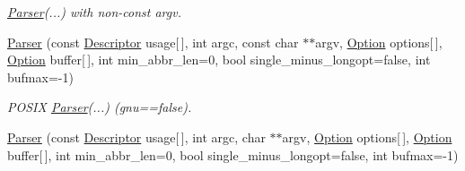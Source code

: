 \begin{DoxyCompactItemize}
\begin{DoxyCompactList}\small\item\em \hyperlink{classxmem_1_1config_1_1third__party_1_1_parser}{Parser}(...) with non-\/const argv. \end{DoxyCompactList}\item 
\hypertarget{classxmem_1_1config_1_1third__party_1_1_parser_a3d0990e00bad445fb5753ace6283d497}{}\hyperlink{classxmem_1_1config_1_1third__party_1_1_parser_a3d0990e00bad445fb5753ace6283d497}{Parser} (const \hyperlink{structxmem_1_1config_1_1third__party_1_1_descriptor}{Descriptor} usage\mbox{[}$\,$\mbox{]}, int argc, const char $\ast$$\ast$argv, \hyperlink{classxmem_1_1config_1_1third__party_1_1_option}{Option} options\mbox{[}$\,$\mbox{]}, \hyperlink{classxmem_1_1config_1_1third__party_1_1_option}{Option} buffer\mbox{[}$\,$\mbox{]}, int min\+\_\+abbr\+\_\+len=0, bool single\+\_\+minus\+\_\+longopt=false, int bufmax=-\/1)\label{classxmem_1_1config_1_1third__party_1_1_parser_a3d0990e00bad445fb5753ace6283d497}

\begin{DoxyCompactList}\small\item\em P\+O\+S\+I\+X \hyperlink{classxmem_1_1config_1_1third__party_1_1_parser}{Parser}(...) (gnu==false). \end{DoxyCompactList}\item 
\hypertarget{classxmem_1_1config_1_1third__party_1_1_parser_ad3d40c69fbb64462daf43b84334cb28b}{}\hyperlink{classxmem_1_1config_1_1third__party_1_1_parser_ad3d40c69fbb64462daf43b84334cb28b}{Parser} (const \hyperlink{structxmem_1_1config_1_1third__party_1_1_descriptor}{Descriptor} usage\mbox{[}$\,$\mbox{]}, int argc, char $\ast$$\ast$argv, \hyperlink{classxmem_1_1config_1_1third__party_1_1_option}{Option} options\mbox{[}$\,$\mbox{]}, \hyperlink{classxmem_1_1config_1_1third__party_1_1_option}{Option} buffer\mbox{[}$\,$\mbox{]}, int min\+\_\+abbr\+\_\+len=0, bool single\+\_\+minus\+\_\+longopt=false, int bufmax=-\/1)\label{classxmem_1_1config_1_1third__party_1_1_parser_ad3d40c69fbb64462daf43b84334cb28b}


\end{DoxyCompactItemize}
